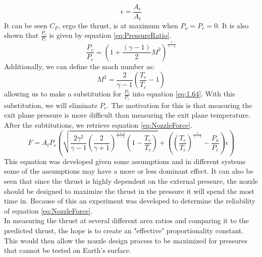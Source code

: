 \begin{equation}\label{eq:ExpansionRatio}
\epsilon=\frac{A_e}{A_t}
\end{equation}%
It can be seen $C_F$, ergo the thrust, is at maximum when $P_a=P_e=0$. It is also shown that $\frac{P_e}{P_c}$ is given by equation \ref{eq:PressureRatio}.
\begin{equation}\label{eq:PressureRatio}
\frac{P_e}{P_c}=\left(1+\frac{(\gamma-1)}{2}M^2\right)^{\frac{\gamma}{\gamma-1}}
\end{equation}%
%
Additionally, we can define the mach number as:
\begin{equation}\label{eq:MachNumber}
M^2=\frac{2}{\gamma-1}\left(\frac{T_c}{T_e}-1\right)
\end{equation}
allowing us to make a substitution for $\frac{P_e}{P_c}$ into equation \ref{eq:1.64}. With this substitution, we will eliminate $P_e$. The motivation for this is that measuring the exit plane pressure is more difficult than measuring the exit plane temperature. After the subtitutions, we retrieve equation \ref{eq:NozzleForce}.
\begin{equation}\label{eq:NozzleForce}
F = A_t P_c \left(\sqrt{\frac{2\gamma^2}{\gamma-1}\left(\frac{2}{\gamma+1}\right)^{\frac{\gamma+1}{\gamma-1}}\left(1-\frac{T_e}{T_c}\right)}+\left(\left(\frac{T_e}{T_c}\right)^{\frac{\gamma}{\gamma-1}}-\frac{P_a}{P_c}\right)\epsilon\right)
\end{equation}
This equation was developed given some assumptions and in different systems some of the assumptions may have a more or less dominant effect. It can also be seen that since the thrust is highly dependent on the external pressure, the nozzle should be designed to maximize the thrust in the pressure it will spend the most time in. Because of this an experiment was developed to determine the reliability of equation \ref{eq:NozzleForce}.\\
In measuring the thrust at several different area ratios and comparing it to the predicted thrust, the hope is to create an "effective" proportionality constant. This would then allow the nozzle design process to be maximized for pressures that cannot be tested on Earth's surface.
